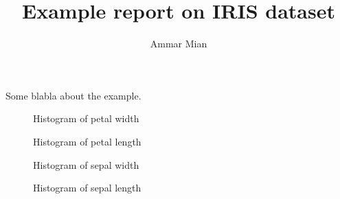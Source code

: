 \documentclass[letterpaper]{ieeeconf}
\title{Example report on IRIS dataset}
\author{Ammar Mian}
\begin{document}
\maketitle

Some blabla about the example.

\kant[1]

\begin{figure}[h]
    \centering
    
    \caption{Histogram of petal width}
    \label{fig:histogram_petal_width}
\end{figure}

\kant[2]

\begin{figure}[h]
    \centering
    
    \caption{Histogram of petal length}
    \label{fig:histogram_petal_length}
\end{figure}

\begin{figure}[h]
    \centering
    
    \caption{Histogram of sepal width}
    \label{fig:histogram_sepal_width}
\end{figure}

\kant[3]

\begin{figure}[h]
    \centering
    
    \caption{Histogram of sepal length}
    \label{fig:histogram_sepal_length}
\end{figure}

\kant[4]
\end{document}
